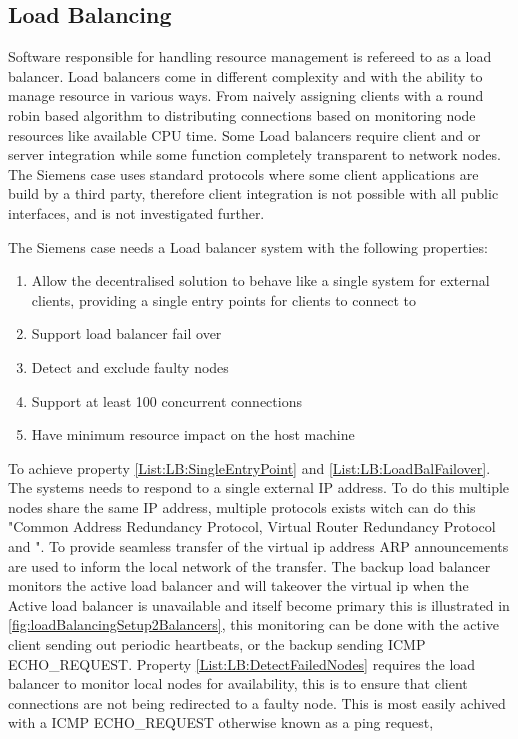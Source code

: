 \subsection{Load Balancing}
Software responsible for handling resource management is refereed to as a load balancer.
Load balancers come in different complexity and with the ability to manage resource in various ways.
From naively assigning clients with a round robin based algorithm to distributing connections based on monitoring node resources like available CPU time. 
Some Load balancers require client and or server integration  while some function completely transparent to network nodes. 
The Siemens case uses standard protocols where some client applications are build by a third party,
therefore client integration is not possible with all public interfaces, and is not investigated further.

The Siemens case needs a Load balancer system with the following properties:
\begin{enumerate}[label=\textbf{P.\arabic*}, ref=\textit{P.\arabic*}]
	\item \label{List:LB:SingleEntryPoint}Allow the decentralised solution to behave like a single system for external clients, providing a single entry points for clients to connect to
	\item \label{List:LB:LoadBalFailover} Support load balancer fail over
	\item \label{List:LB:DetectFailedNodes} Detect and exclude faulty nodes 
	\item Support at least 100 concurrent connections
	\item Have minimum resource impact on the host machine
\end{enumerate}


To achieve property \ref{List:LB:SingleEntryPoint} and \ref{List:LB:LoadBalFailover}.
The systems needs to respond to a single external IP address. To do this multiple nodes share the same IP address, multiple protocols exists witch can do this "Common Address Redundancy Protocol, Virtual Router Redundancy Protocol and \cite{zhang2000linuxVirtualServer}". To provide seamless transfer of the virtual ip address ARP announcements are used to inform the local network of the transfer. The backup load balancer monitors the active load balancer and will takeover the virtual ip when the Active load balancer is unavailable and itself become primary this is illustrated in \cref{fig:loadBalancingSetup2Balancers}, this monitoring can be done with the active client sending out periodic heartbeats, or the backup sending ICMP ECHO\_REQUEST.
Property \ref{List:LB:DetectFailedNodes} requires the load balancer to monitor local nodes for availability, this is to ensure that client connections are not being redirected to a faulty node. This is most easily achived with a ICMP ECHO\_REQUEST otherwise known as a ping request, 


